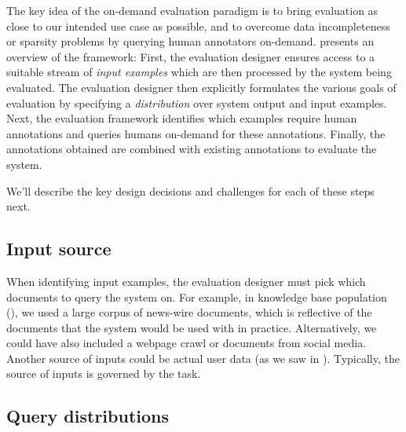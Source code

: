
The key idea of the on-demand evaluation paradigm is to bring evaluation as close to our intended use case as possible, and to overcome data incompleteness or sparsity problems by querying human annotators on-demand.
 presents an overview of the framework: 
First, the evaluation designer ensures access to a suitable stream of \textit{input examples}
which are then processed by the system being evaluated.
The evaluation designer then explicitly formulates the various goals of evaluation by specifying a \textit{distribution} over system output and input examples.
Next, the evaluation framework identifies which examples require human annotations and queries humans on-demand for these annotations. 
Finally, the annotations obtained are combined with existing annotations to evaluate the system.

We'll describe the key design decisions and challenges for each of these steps next.

\subsection{Input source}

When identifying input examples, the evaluation designer must pick which documents to query the system on.
For example, in knowledge base population (), we used a large corpus of news-wire documents, which is reflective of the documents that the system would be used with in practice.
Alternatively, we could have also included a webpage crawl or documents from social media.
Another source of inputs could be actual user data (as we saw in ).
Typically, the source of inputs is governed by the task.

\subsection{Query distributions}


